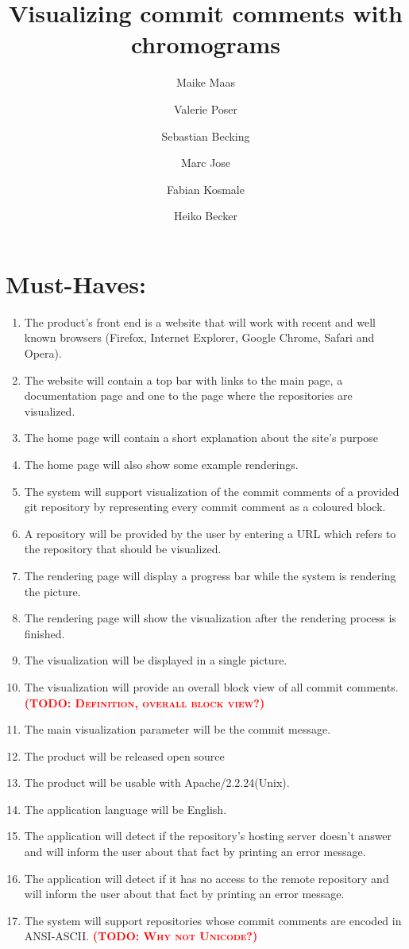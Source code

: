 \documentclass[12pt]{scrartcl}
\author{Maike Maas \and Valerie Poser \and Sebastian Becking
\and Marc Jose \and Fabian Kosmale  \and Heiko Becker}
\title{Visualizing commit comments with chromograms}
\newcommand{\todo}[1]{\textbf{\textsc{\textcolor{red}{(TODO: #1)}}}}
\begin{document}
\maketitle
\section{Must-Haves:}
\begin{enumerate}
\item The product's front end is a website that will work with recent and well known browsers (Firefox, Internet Explorer, Google Chrome, Safari and Opera). 
\item The website will contain a top bar with links to the main page, a documentation page and one to the page where the repositories are visualized. 
\item The home page will contain a short explanation about the site's purpose
\item The home page will also show some example renderings.
\item The system will support visualization of the commit comments of a provided git repository by representing every commit comment as a coloured block.
\item A repository will be provided by the user by entering a URL which refers to the repository that should be visualized.
\item The rendering page will display a progress bar while the system is rendering the picture.
\item The rendering page will show the visualization after the rendering process is finished.
\item The visualization will be displayed in a single picture.
\item The visualization will provide an overall block view of all commit comments.
\todo{Definition, overall block view?}
\item The main visualization parameter will be the commit message.
\item The product will be released open source 
\item The product will be usable with Apache/2.2.24(Unix).
\item The application language will be English.
\item The application will detect if the repository's hosting server doesn't answer and will inform the user about that fact by printing an error message.
\item The application will detect if it has no access to the remote repository and will inform the user about that fact by printing an error message.
\item The system will support repositories whose commit comments are encoded in ANSI-ASCII. \todo{Why not Unicode?}
\end{enumerate}
\end{document}
